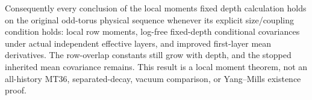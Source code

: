 \documentclass[11pt]{article}
\begin{document}
Consequently every conclusion of the local moments fixed depth calculation holds on the original odd-torus physical sequence
whenever its explicit size/coupling condition holds: local row moments, log-free fixed-depth
conditional covariances under actual independent effective layers, and improved first-layer
mean derivatives. The row-overlap constants still grow with depth, and the stopped inherited
mean covariance remains. This result is a local moment theorem, not an all-history MT36,
separated-decay, vacuum comparison, or Yang--Mills existence proof.
\end{document}
